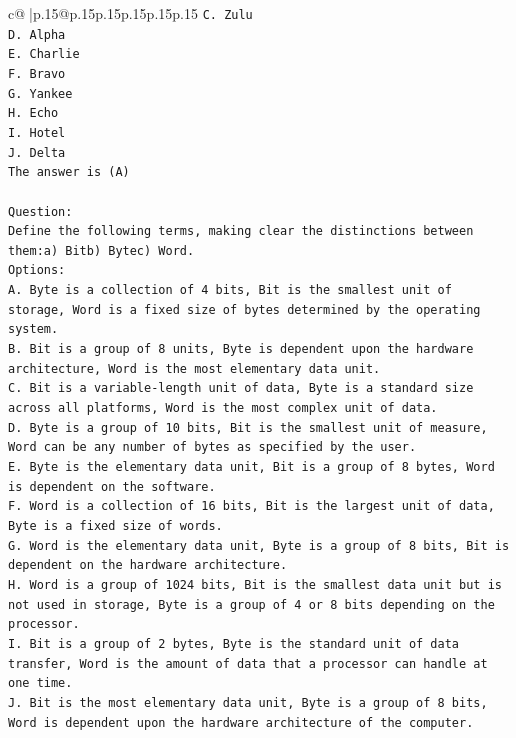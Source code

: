 \documentclass{article}
\begin{document}
{\begin{supertabular}{c@{$\;$}|p{.15\linewidth}@{}p{.15\linewidth}p{.15\linewidth}p{.15\linewidth}p{.15\linewidth}p{.15\linewidth}}
{{{\texttt{C. Zulu} \\
\texttt{D. Alpha} \\
\texttt{E. Charlie} \\
\texttt{F. Bravo} \\
\texttt{G. Yankee} \\
\texttt{H. Echo} \\
\texttt{I. Hotel} \\
\texttt{J. Delta} \\
\texttt{The answer is (A)} \\
\\ 
\texttt{Question:} \\
\texttt{Define the following terms, making clear the distinctions between them:a) Bitb) Bytec) Word.} \\
\texttt{Options:} \\
\texttt{A. Byte is a collection of 4 bits, Bit is the smallest unit of storage, Word is a fixed size of bytes determined by the operating system.} \\
\texttt{B. Bit is a group of 8 units, Byte is dependent upon the hardware architecture, Word is the most elementary data unit.} \\
\texttt{C. Bit is a variable{-}length unit of data, Byte is a standard size across all platforms, Word is the most complex unit of data.} \\
\texttt{D. Byte is a group of 10 bits, Bit is the smallest unit of measure, Word can be any number of bytes as specified by the user.} \\
\texttt{E. Byte is the elementary data unit, Bit is a group of 8 bytes, Word is dependent on the software.} \\
\texttt{F. Word is a collection of 16 bits, Bit is the largest unit of data, Byte is a fixed size of words.} \\
\texttt{G. Word is the elementary data unit, Byte is a group of 8 bits, Bit is dependent on the hardware architecture.} \\
\texttt{H. Word is a group of 1024 bits, Bit is the smallest data unit but is not used in storage, Byte is a group of 4 or 8 bits depending on the processor.} \\
\texttt{I. Bit is a group of 2 bytes, Byte is the standard unit of data transfer, Word is the amount of data that a processor can handle at one time.} \\
\texttt{J. Bit is the most elementary data unit, Byte is a group of 8 bits, Word is dependent upon the hardware architecture of the computer.} \\
            }
        }
    }
     \\ \\


\end{supertabular}}
\end{document}
